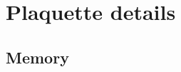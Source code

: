 \documentclass{article}
\begin{document}
\begin{longtable}{ |l|l|l|l| }
\end{longtable}

\newpage
\section{Plaquette details}

\subsection{Memory}
\end{document}
